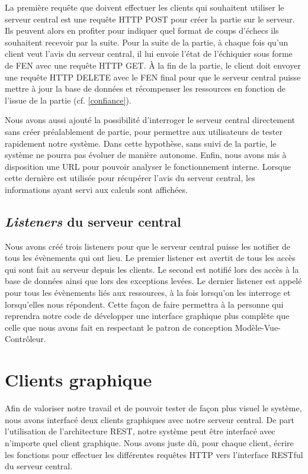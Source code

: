 \documentclass[a4paper,11pt]{article}
\begin{document}
La première requête que doivent effectuer les clients qui souhaitent utiliser le serveur central est une requête HTTP POST pour créer la partie sur le serveur. Ils peuvent alors en profiter pour indiquer quel format de coups d'échecs ils souhaitent recevoir par la suite. Pour la suite de la partie, à chaque fois qu'un client veut l'avis du serveur central, il lui envoie l'état de l'échiquier sous forme de FEN avec une requête HTTP GET. À la fin de la partie, le client doit envoyer une requête HTTP DELETE avec le FEN final pour que le serveur central puisse mettre à jour la base de données et récompenser les ressources en fonction de l'issue de la partie (cf. \ref{confiance}).

Nous avons aussi ajouté la possibilité d'interroger le serveur central directement sans créer préalablement de partie, pour permettre aux utilisateurs de tester rapidement notre système. Dans cette hypothèse, sans suivi de la partie, le système ne pourra pas évoluer de manière autonome. Enfin, nous avons mis à disposition une URL pour pouvoir analyser le fonctionnement interne. Lorsque cette dernière est utilisée pour récupérer l'avis du serveur central, les informations ayant servi aux calculs sont affichées.

\subsection{{\it Listeners} du serveur central}
Nous avons créé trois listeners pour que le serveur central puisse les notifier de tous les évènements qui ont lieu. Le premier listener est avertit de tous les accès qui sont fait au serveur depuis les clients. Le second est notifié lors des accès à la base de données ainsi que lors des exceptions levées. Le dernier listener est appelé pour tous les évènements liés aux ressources, à la fois lorsqu'on les interroge et lorsqu'elles nous répondent.
Cette façon de faire permettra à la personne qui reprendra notre code de développer une interface graphique plus complète que celle que nous avons fait en respectant le patron de conception Modèle-Vue-Contrôleur.


\section{Clients graphique}
Afin de valoriser notre travail et de pouvoir tester de façon plus visuel le système, nous avons interfacé deux clients graphiques avec notre serveur central. De part l'utilisation de l'architecture REST, notre système peut être interfacé avec n'importe quel client graphique. Nous avons juste dû, pour chaque client, écrire les fonctions pour effectuer les différentes requêtes HTTP vers l'interface RESTful du serveur central.
\end{document}

